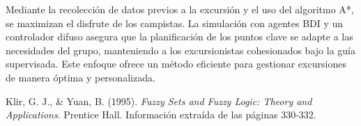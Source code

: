 \documentclass[10pt,twocolumn]{article}
\begin{document}
	Mediante la recolección de datos previos a la excursión y el uso del algoritmo A*, se maximizan el disfrute de los campistas. La simulación con agentes BDI y un controlador difuso asegura que la planificación de los puntos clave se adapte a las necesidades del grupo, manteniendo a los excursionistas cohesionados bajo la guía supervisada. Este enfoque ofrece un método eficiente para gestionar excursiones de manera óptima y personalizada.
	
	
	\begin{thebibliography}{9}
		
		 Klir, G. J., \& Yuan, B. (1995). \textit{Fuzzy Sets and Fuzzy Logic: Theory and Applications}. Prentice Hall. Información extraída de las páginas 330-332.
		
	\end{thebibliography}
	
	
\end{document}
